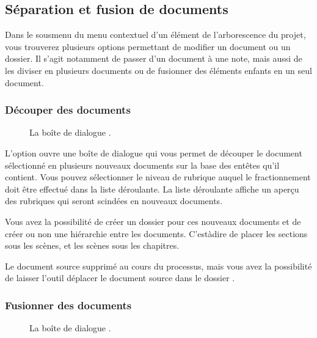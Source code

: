 \documentclass[a4paper,11pt,french]{sphinxmanual}
\begin{document}
\subsection{Séparation et fusion de documents}
\label{\detokenize{usage_project:splitting-and-merging-documents}}\label{\detokenize{usage_project:a-ui-tree-split-merge}}
\sphinxAtStartPar
Dans le sous\sphinxhyphen{}menu  du menu contextuel d’un élément de l’arborescence du projet, vous trouverez plusieurs options permettant de modifier un document ou un dossier. Il s’agit notamment de passer d’un document à une note, mais aussi de les diviser en plusieurs documents ou de fusionner des éléments enfants en un seul document.


\subsubsection{Découper des documents}
\label{\detokenize{usage_project:splitting-documents}}
\begin{figure}[htbp]
\centering
\capstart

\noindent{}
\caption{La boîte de dialogue .}\label{\detokenize{usage_project:id2}}\end{figure}

\sphinxAtStartPar
L’option  ouvre une boîte de dialogue qui vous permet de découper le document sélectionné en plusieurs nouveaux documents sur la base des en\sphinxhyphen{}têtes qu’il contient. Vous pouvez sélectionner le niveau de rubrique auquel le fractionnement doit être effectué dans la liste déroulante. La liste déroulante affiche un aperçu des rubriques qui seront scindées en nouveaux documents.

\sphinxAtStartPar
Vous avez la possibilité de créer un dossier pour ces nouveaux documents et de créer ou non une hiérarchie entre les documents. C’est\sphinxhyphen{}à\sphinxhyphen{}dire de placer les sections sous les scènes, et les scènes sous les chapitres.

\sphinxAtStartPar
Le document source  supprimé au cours du processus, mais vous avez la possibilité de laisser l’outil déplacer le document source dans le dossier .


\subsubsection{Fusionner des documents}
\label{\detokenize{usage_project:merging-documents}}
\begin{figure}[htbp]
\centering
\capstart

\noindent{}
\caption{La boîte de dialogue .}\label{\detokenize{usage_project:id3}}\end{figure}
\end{document}
